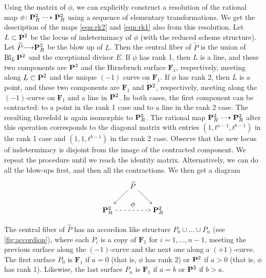 \documentclass[reqno]{amsart}
\DeclareMathOperator{\Bl}{Bl}
\renewcommand{\to}{{\longrightarrow}}
\renewcommand {\P}{{\bf P}}
\numberwithin{equation}{section}
\newcommand{\F}{\mathbf{F}}
\begin{document}
Using the matrix of $\phi$, we can explicitly construct a resolution of the rational map $\phi \colon \P^2_R \dashrightarrow \P^2_R$ using a sequence of elementary transformations.
We get the description of the maps \eqref{eqn:rk2} and \eqref{eqn:rk1} also from this resolution.
Let $L \subset \P^2$ be the locus of indeterminacy of $\phi$ (with the reduced scheme structure).
Let $\widetilde P \to \P^2_R$ be the blow up of $L$.
Then the central fiber of $\widetilde P$ is the union of $\Bl_L\P^2$ and the exceptional divisor $E$.
If $\phi$ has rank 1, then $L$ is a line, and these two components are $\P^2$ and the Hirzebruch surface $\F_1$, respectively, meeting along $L \subset \P^2$ and the unique $(-1)$ curve on $\F_1$.
If $\phi$ has rank 2, then $L$ is a point, and these two components are $\F_1$ and $\P^2$, respectively, meeting along the $(-1)$-curve on $\F_1$ and a line in $\P^2$.
In both cases, the first component can be contracted: to a point in the rank 1 case and to a line in the rank 2 case.
The resulting threefold is again isomorphic to $\P^2_R$.
The rational map $\P^2_R \dashrightarrow \P^2_R$ after this operation corresponds to the diagonal matrix with entries $(1,t^{a-1}, t^{b-1})$ in the rank 1 case and $(1, 1, t^{b-1})$ in the rank 2 case.
Observe that the new locus of indeterminacy is disjoint from the image of the contracted component.
We repeat the procedure until we reach the identity matrix.
Alternatively, we can do all the blow-ups first, and then all the contractions.
We then get a diagram
\[
\begin{tikzpicture}[node distance=5em]
  \node (t) {$\widehat P$};
  \node (l) [below left of=t] {$\P^2_R$};
  \node (r) [below right of=t] {$\P^2_R$};
  \path [->] (l) edge[dashed]  node[above] {$\phi$}  (r) (t) edge (l) (t) edge (r);
\end{tikzpicture}
\]
The central fiber of $\widehat P$ has an accordion like structure $P_0 \cup \dots \cup P_n$ (see \autoref{fig:accordion}), where each $P_i$ is a copy of $\F_1$ for $i = 1, \dots, n-1$, meeting the previous surface along the $(-1)$-curve and the next one along a $(+1)$-curve.
The first surface $P_0$ is $\F_1$ if $a = 0$ (that is, $\phi$ has rank 2) or $\P^2$ if $a > 0$ (that is, $\phi$ has rank 1).
Likewise, the last surface $P_n$ is $\F_1$ if $a = b$ or $\P^2$ if $b > a$.
\end{document}
